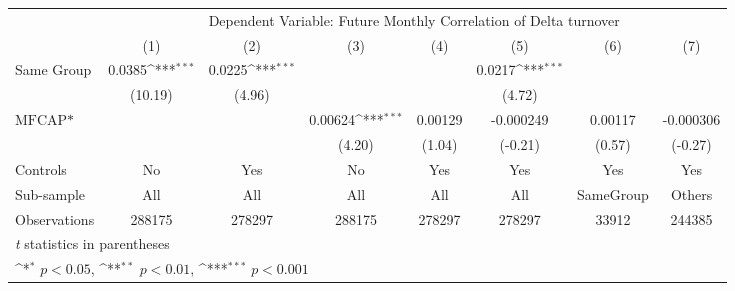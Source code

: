 {
\def\sym#1{\ifmmode^{#1}\else\(^{#1}\)\fi}
\begin{tabular}{l*{7}{c}}
\hline\hline
                &\multicolumn{7}{c}{Dependent Variable:  Future Monthly Correlation of Delta turnover}                                               \\\cmidrule(lr){2-8}
                &\multicolumn{1}{c}{(1)}         &\multicolumn{1}{c}{(2)}         &\multicolumn{1}{c}{(3)}         &\multicolumn{1}{c}{(4)}         &\multicolumn{1}{c}{(5)}         &\multicolumn{1}{c}{(6)}         &\multicolumn{1}{c}{(7)}         \\
\hline
Same Group      &   0.0385\sym{***}&   0.0225\sym{***}&                  &                  &   0.0217\sym{***}&                  &                  \\
                &  (10.19)         &   (4.96)         &                  &                  &   (4.72)         &                  &                  \\
[1em]
$ \text{MFCAP*} $&                  &                  &  0.00624\sym{***}&  0.00129         &-0.000249         &  0.00117         &-0.000306         \\
                &                  &                  &   (4.20)         &   (1.04)         &  (-0.21)         &   (0.57)         &  (-0.27)         \\
\hline
Controls        &       No         &      Yes         &       No         &      Yes         &      Yes         &      Yes         &      Yes         \\
Sub-sample      &      All         &      All         &      All         &      All         &      All         &SameGroup         &   Others         \\
Observations    &   288175         &   278297         &   288175         &   278297         &   278297         &    33912         &   244385         \\
\hline\hline
\multicolumn{8}{l}{\footnotesize \textit{t} statistics in parentheses}\\
\multicolumn{8}{l}{\footnotesize \sym{*} \(p<0.05\), \sym{**} \(p<0.01\), \sym{***} \(p<0.001\)}\\
\end{tabular}
}
